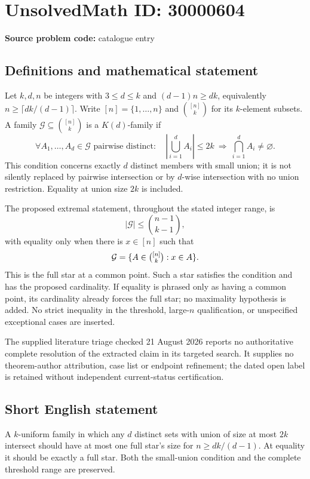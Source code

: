 \documentclass[11pt]{article}
\begin{document}
\section*{UnsolvedMath ID: 30000604}
\textbf{Source problem code:} catalogue entry
\subsection{Definitions and mathematical statement}
Let $k,d,n$ be integers with $3\leq d\leq k$ and $(d-1)n\geq dk$, equivalently $n\geq\lceil dk/(d-1)\rceil$. Write $[n]=\{1,\ldots,n\}$ and $\binom{[n]}k$ for its $k$-element subsets. A family $\mathcal G\subseteq\binom{[n]}k$ is a $K(d)$-family if
\[
 \forall A_1,\ldots,A_d\in\mathcal G\text{ pairwise distinct}:\quad
 \left|\bigcup_{i=1}^d A_i\right|\leq2k
 \ \Longrightarrow\ 
 \bigcap_{i=1}^d A_i\ne\varnothing.
\]
This condition concerns exactly $d$ distinct members with small union; it is not silently replaced by pairwise intersection or by $d$-wise intersection with no union restriction. Equality at union size $2k$ is included.

The proposed extremal statement, throughout the stated integer range, is
\[
 |\mathcal G|\leq\binom{n-1}{k-1},
\]
with equality only when there is $x\in[n]$ such that
\[
 \mathcal G=\{A\in\tbinom{[n]}k:x\in A\}.
\]
This is the full star at a common point. Such a star satisfies the condition and has the proposed cardinality. If equality is phrased only as having a common point, its cardinality already forces the full star; no maximality hypothesis is added. No strict inequality in the threshold, large-$n$ qualification, or unspecified exceptional cases are inserted.

The supplied literature triage checked 21 August 2026 reports no authoritative complete resolution of the extracted claim in its targeted search. It supplies no theorem-author attribution, case list or endpoint refinement; the dated open label is retained without independent current-status certification.
\subsection{Short English statement}
A $k$-uniform family in which any $d$ distinct sets with union of size at most $2k$ intersect should have at most one full star's size for $n\geq dk/(d-1)$. At equality it should be exactly a full star. Both the small-union condition and the complete threshold range are preserved.
\end{document}
